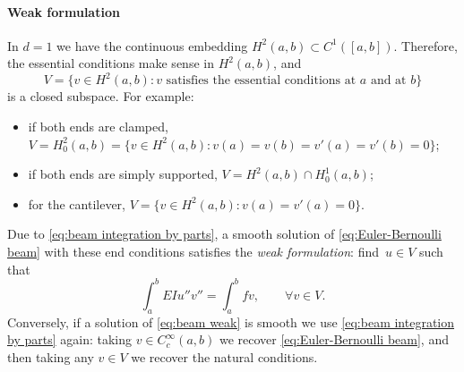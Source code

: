\paragraph{Weak formulation}
In $d = 1$ we have the continuous embedding $H^2(a,b) \subset C^1([a,b])$. Therefore, the essential conditions make sense in $H^2(a,b)$, and
\begin{equation*}
    V = \{ v \in H^2(a,b) : v \text{ satisfies the essential conditions at } a \text{ and at } b \}
\end{equation*}
is a closed subspace. For example:
\begin{itemize}
    \item if both ends are clamped, $V = H_0^2(a,b) = \{ v \in H^2(a,b) : v(a) = v(b) = v'(a) = v'(b) = 0 \}$;
    \item if both ends are simply supported, $V = H^2(a,b) \cap H_0^1(a,b)$;
    \item for the cantilever, $V = \{ v \in H^2(a,b) : v(a) = v'(a) = 0 \}$.
\end{itemize}
Due to \eqref{eq:beam integration by parts}, a smooth solution of \eqref{eq:Euler-Bernoulli beam} with these end conditions satisfies the \emph{weak formulation}: \mbox{find $u \in V$} such that
\begin{equation}
    \label{eq:beam weak}
    \int_a^b EI u'' v'' = \int_a^b f v, \qquad \forall v \in V.
\end{equation}
Conversely, if a solution of \eqref{eq:beam weak} is smooth we use \eqref{eq:beam integration by parts} again: taking $v \in C_c^\infty(a,b)$ we recover \eqref{eq:Euler-Bernoulli beam}, and then taking any $v \in V$ we recover the natural conditions.


